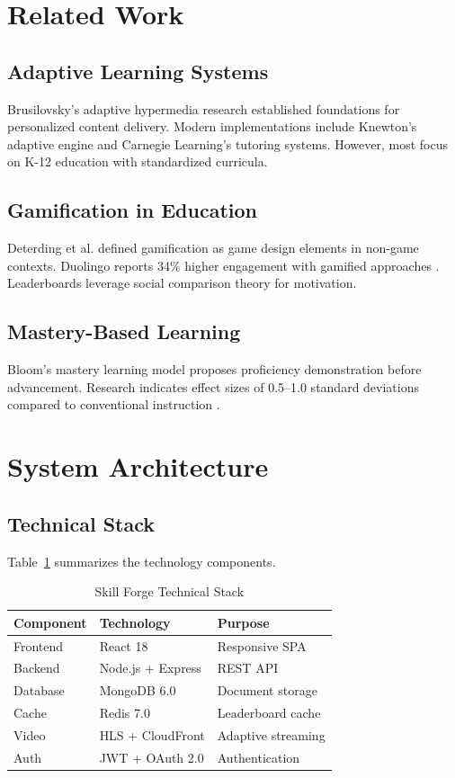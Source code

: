 \documentclass[conference]{IEEEtran}
\begin{document}
\section{Related Work}

\subsection{Adaptive Learning Systems}

Brusilovsky's adaptive hypermedia research \cite{brusilovsky2001} established foundations for personalized content delivery. Modern implementations include Knewton's adaptive engine and Carnegie Learning's tutoring systems. However, most focus on K-12 education with standardized curricula.

\subsection{Gamification in Education}

Deterding et al. \cite{deterding2011} defined gamification as game design elements in non-game contexts. Duolingo reports 34\% higher engagement with gamified approaches \cite{settles2016}. Leaderboards leverage social comparison theory for motivation.

\subsection{Mastery-Based Learning}

Bloom's mastery learning model \cite{bloom1968} proposes proficiency demonstration before advancement. Research indicates effect sizes of 0.5--1.0 standard deviations compared to conventional instruction \cite{guskey2007}.

\section{System Architecture}

\subsection{Technical Stack}

Table~\ref{tab:techstack} summarizes the technology components.

\begin{table}[htbp]
\caption{Skill Forge Technical Stack}
\label{tab:techstack}
\centering
\begin{tabular}{lll}
\toprule
\textbf{Component} & \textbf{Technology} & \textbf{Purpose} \\
\midrule
Frontend & React 18 & Responsive SPA \\
Backend & Node.js + Express & REST API \\
Database & MongoDB 6.0 & Document storage \\
Cache & Redis 7.0 & Leaderboard cache \\
Video & HLS + CloudFront & Adaptive streaming \\
Auth & JWT + OAuth 2.0 & Authentication \\
\bottomrule
\end{tabular}
\end{table}
\end{document}
